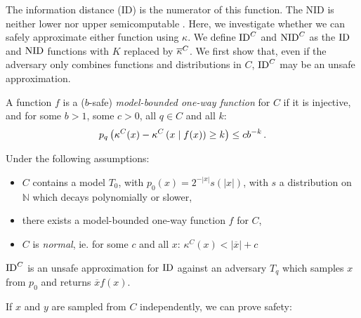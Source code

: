 The information distance (ID) is the numerator of this function. The NID is neither lower nor upper semicomputable \cite{DBLP:journals/jcss/TerwijnTV11}. Here, we investigate whether we can safely approximate either function using $\kappa$. We define $\operatorname*{ID}^C$ and $\operatorname*{NID}^C$ as the $\operatorname*{ID}$ and $\operatorname*{NID}$ functions with $K$ replaced by ${\overline{\kappa}}^C$. We first show that, even if the adversary only combines functions and distributions in $C$, $\operatorname*{ID}^C$ may be an unsafe approximation.

\renewcommand*{\thefootnote}{\arabic{footnote}}
 
\begin{definition}\footnotemark
A function $f$ is a ($b$-safe) \emph{model-bounded one-way function} for $C$ if it is injective, and for some $b > 1$, some $c > 0$, all $q \in C$ and all $k$: 
\begin{align*}
p_q\left (\kappa^C(x) - \kappa^C\left(x\mid f(x)\right ) \geq k\right ) \leq cb^{-k} \,\text{.}
\end{align*}
\label{definition:one-way}
\end{definition}


\renewcommand*{\thefootnote}{\fnsymbol{footnote}}

\begin{theorem}\footnotemark[2]
\label{theorem:unsafe-id}
Under the following assumptions:
\begin{itemize}
\item $C$ contains a model $T_0$, with $p_0(x) = 2^{-|x|}s(|x|)$, with $s$ a distribution on $\mathbb N$ which decays polynomially or slower,
\item there exists a model-bounded one-way function $f$ for $C$,
\item $C$ is \emph{normal}, ie. for some $c$ and all $x$: $\kappa^C(x) <  |\overline{x}| + c$
\end{itemize}
$\operatorname*{ID}^C$ is an unsafe approximation for $\operatorname*{ID}$ against an adversary $T_q$ which samples $x$ from $p_0$ and returns $\overline{x}f(x)$.
\end{theorem}
If $x$ and $y$ are sampled from $C$ independently, we can prove safety:

